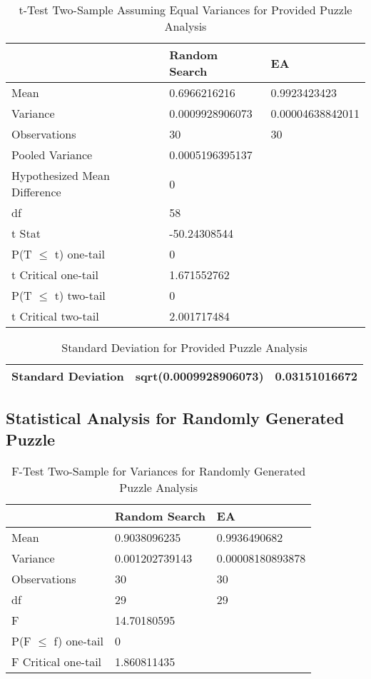 \documentclass[11pt]{article}
\begin{document}
\begin{table}[H]
\centering
\caption{t-Test Two-Sample Assuming Equal Variances for Provided Puzzle Analysis}
\label{my-label}
\begin{tabular}{l|l|l}
 & Random Search & EA \\ \hline
Mean & 0.6966216216 & 0.9923423423 \\
Variance & 0.0009928906073 & 0.00004638842011 \\
Observations & 30 & 30 \\
Pooled Variance & 0.0005196395137 &  \\
Hypothesized Mean Difference & 0 &  \\
df & 58 &  \\
t Stat & -50.24308544 &  \\
P(T $\leq$ t) one-tail & 0 &  \\
t Critical one-tail & 1.671552762 &  \\
P(T $\leq$ t) two-tail & 0 &  \\
t Critical two-tail & 2.001717484 &
\end{tabular}
\end{table}

\begin{table}[H]
\centering
\caption{Standard Deviation for Provided Puzzle Analysis}
\label{my-label}
\begin{tabular}{|l|l|l|}
\hline
Standard Deviation & sqrt(0.0009928906073) & 0.03151016672 \\ \hline
\end{tabular}
\end{table}


\subsection{Statistical Analysis for Randomly Generated Puzzle}

\begin{table}[H]
\centering
\caption{F-Test Two-Sample for Variances for Randomly Generated Puzzle Analysis}
\label{my-label}
\begin{tabular}{l|l|l}
 & Random Search & EA \\ \hline
Mean & 0.9038096235 & 0.9936490682 \\
Variance & 0.001202739143 & 0.00008180893878 \\
Observations & 30 & 30 \\
df & 29 & 29 \\
F & 14.70180595 &  \\
P(F $\leq$ f) one-tail & 0 &  \\
F Critical one-tail & 1.860811435 & 
\end{tabular}
\end{table}
\end{document}
